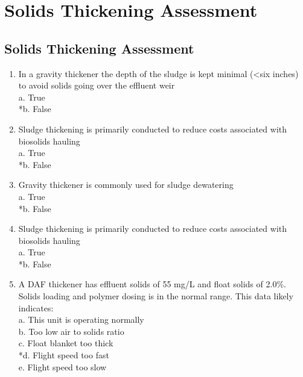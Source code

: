 
\chapter{Solids Thickening Assessment}

\section*{Solids Thickening Assessment}



\begin{enumerate}

\item  In a gravity thickener the depth of the sludge is kept minimal (<six inches) to avoid solids going over the effluent weir \\

a. True \\
*b. False \\

\item  Sludge thickening is primarily conducted to reduce costs associated with biosolids hauling\\


a. True \\
*b. False \\


\item  Gravity thickener is commonly used for sludge dewatering \\

a. True \\
*b. False \\

\item  Sludge thickening is primarily conducted to reduce costs associated with biosolids hauling \\

a. True \\
*b. False \\
\item A DAF thickener has effluent solids of 55 mg/L and float solids of 2.0\%. Solids loading and polymer dosing is in the normal range. This data likely indicates: \\

a. This unit is operating normally \\
b. Too low air to solids ratio \\
c. Float blanket too thick \\
*d. Flight speed too fast \\
e. Flight speed too slow \\


\end{enumerate}
